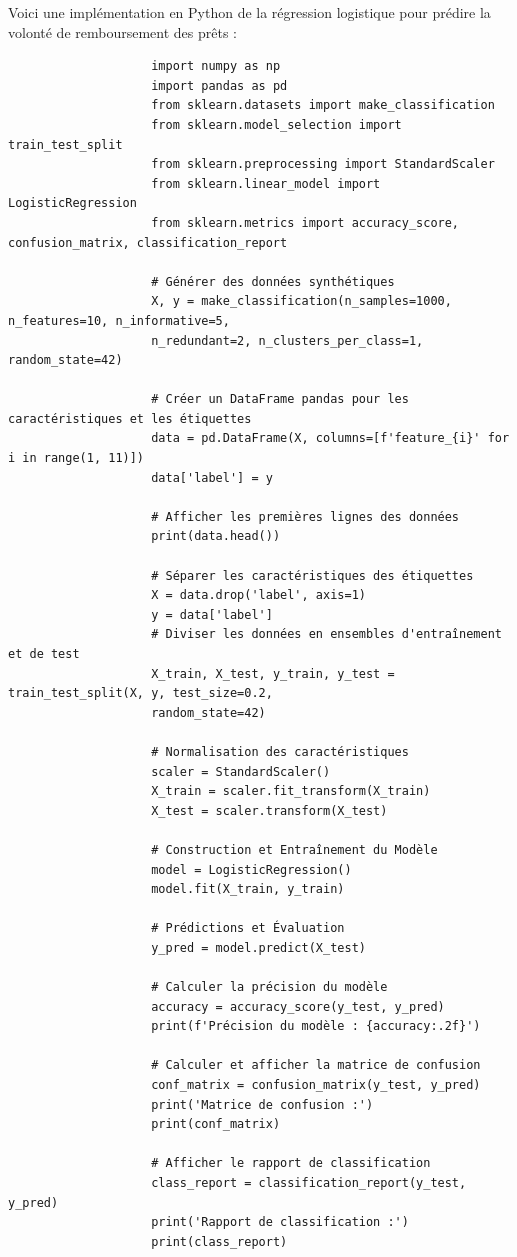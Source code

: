\documentclass[12pt,a4paper,openay]{book}
\numberwithin{equation}{chapter}
\begin{document}
		Voici une impl\'ementation en Python de la r\'egression logistique pour pr\'edire la volont\'e de remboursement des pr\^ets :	
		\begin{verbatim}
					import numpy as np
					import pandas as pd
					from sklearn.datasets import make_classification
					from sklearn.model_selection import train_test_split
					from sklearn.preprocessing import StandardScaler
					from sklearn.linear_model import LogisticRegression
					from sklearn.metrics import accuracy_score, confusion_matrix, classification_report
					
					# Générer des données synthétiques
					X, y = make_classification(n_samples=1000, n_features=10, n_informative=5,
					n_redundant=2, n_clusters_per_class=1, random_state=42)
					
					# Créer un DataFrame pandas pour les caractéristiques et les étiquettes
					data = pd.DataFrame(X, columns=[f'feature_{i}' for i in range(1, 11)])
					data['label'] = y
					
					# Afficher les premières lignes des données
					print(data.head())
					
					# Séparer les caractéristiques des étiquettes
					X = data.drop('label', axis=1)
					y = data['label']			
					# Diviser les données en ensembles d'entraînement et de test
					X_train, X_test, y_train, y_test = train_test_split(X, y, test_size=0.2, 
					random_state=42)
					
					# Normalisation des caractéristiques
					scaler = StandardScaler()
					X_train = scaler.fit_transform(X_train)
					X_test = scaler.transform(X_test)
					
					# Construction et Entraînement du Modèle
					model = LogisticRegression()
					model.fit(X_train, y_train)
					
					# Prédictions et Évaluation
					y_pred = model.predict(X_test)
					
					# Calculer la précision du modèle
					accuracy = accuracy_score(y_test, y_pred)
					print(f'Précision du modèle : {accuracy:.2f}')
					
					# Calculer et afficher la matrice de confusion
					conf_matrix = confusion_matrix(y_test, y_pred)
					print('Matrice de confusion :')
					print(conf_matrix)
					
					# Afficher le rapport de classification
					class_report = classification_report(y_test, y_pred)
					print('Rapport de classification :')
					print(class_report)
			\end{verbatim}
		
\end{document}
